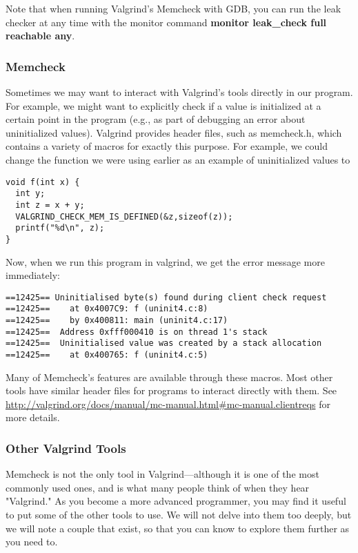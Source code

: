 \documentclass[11pt, a4paper]{article}
\begin{document}
Note that when running Valgrind's Memcheck with GDB, you can run the leak checker at any time with the monitor command \textbf{monitor leak\_check full reachable any}.


\subsubsection{Memcheck}%
\label{ssub:memcheck}

Sometimes we may want to interact with Valgrind's tools directly in our program. For example, we might want to explicitly check if a value is initialized at a certain point in the program (e.g., as part of debugging an error about uninitialized values). Valgrind provides header files, such as memcheck.h, which contains a variety of macros for exactly this purpose. For example, we could change the function we were using earlier as an example of uninitialized values to



\begin{verbatim}
void f(int x) {
  int y;
  int z = x + y;
  VALGRIND_CHECK_MEM_IS_DEFINED(&z,sizeof(z));
  printf("%d\n", z);
}
\end{verbatim}



Now, when we run this program in valgrind, we get the error message more immediately:


\begin{verbatim}
==12425== Uninitialised byte(s) found during client check request
==12425==    at 0x4007C9: f (uninit4.c:8)
==12425==    by 0x400811: main (uninit4.c:17)
==12425==  Address 0xfff000410 is on thread 1's stack
==12425==  Uninitialised value was created by a stack allocation
==12425==    at 0x400765: f (uninit4.c:5)
\end{verbatim}


Many of Memcheck's features are available through these macros. Most other tools have similar header files for programs to interact directly with them. See \url{http://valgrind.org/docs/manual/mc-manual.html#mc-manual.clientreqs} for more details.




\subsubsection{Other Valgrind Tools}%
\label{ssub:other_valgrind_tools}




Memcheck is not the only tool in Valgrind—although it is one of the most commonly used ones, and is what many people think of when they hear "Valgrind." As you become a more advanced programmer, you may find it useful to put some of the other tools to use. We will not delve into them too deeply, but we will note a couple that exist, so that you can know to explore them further as you need to.
\end{document}
